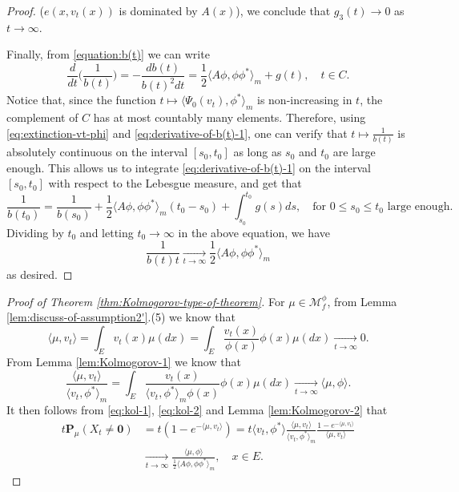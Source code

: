 \documentclass[UTF8]{pkuthss}
\theoremstyle{plain}
\theoremstyle{definition}
\numberwithin{equation}{section}
\begin{document}
\begin{proof}
	($e(x,v_t(x))$ is dominated by $ A(x)$), we conclude that $g_3(t)\to 0$ as $t\to\infty$.
\par
	Finally, from \eqref{equation:b(t)} we can write
\begin{equation}\label{eq:derivative-of-b(t)-1}
	\frac{d}{dt} \Big(\frac{1}{b(t)}\Big)
	= -\frac{d b(t)}{b(t)^2dt}
	= \frac{1}{2}\langle  A\phi,\phi\phi^*\rangle_m + g(t),
	\quad t\in C.
\end{equation}
	Notice that, since the function $t\mapsto \langle\Psi_0(v_t),\phi^*\rangle_m$ is non-increasing in $t$, 
		the complement of $C$ has at most countably many elements.
	Therefore, using \eqref{eq:extinction-vt-phi} and \eqref{eq:derivative-of-b(t)-1}, one can verify that $t\mapsto \frac{1}{b(t)}$ is absolutely continuous on the interval $[s_0,t_0]$ as long as $s_0$ and $t_0$ are large enough.
	This allows us to integrate \eqref{eq:derivative-of-b(t)-1} on the interval $[s_0,t_0]$ with respect to the Lebesgue measure, and get that
\[
	\frac{1}{b(t_0)}
	= \frac{1}{b(s_0)} + \frac{1}{2}\langle A\phi,\phi\phi^*\rangle_m(t_0-s_0) + \int_{s_0}^{t_0} g(s)ds,
	\quad \text{for } 0\leq s_0\leq t_0 \text{ large enough}.
\]
	Dividing by $t_0$ and letting $t_0\to\infty$ in the above equation, we have
\[
	\frac{1}{b(t)t}
	\xrightarrow[t\to\infty]{} \frac{1}{2}\langle  A\phi,\phi\phi^*\rangle_m
\]
	as desired.
\end{proof}
\begin{proof}[Proof of Theorem \ref{thm:Kolmogorov-type-of-theorem}]
	For $\mu \in \mathcal M^\phi_f$, from Lemma \ref{lem:discuss-of-assumption2'}.(5) we know that
\begin{equation}\label{eq:kol-1}
	\langle \mu ,v_t\rangle
    = \int_E v_t(x) \mu(dx)
	= \int_E \frac{v_t(x)}{\phi(x)} \phi(x)\mu(dx)
	\xrightarrow[t\to\infty]{} 0.
\end{equation}
	From Lemma \ref{lem:Kolmogorov-1} we know that
\begin{equation}\label{eq:kol-2}
     \frac {\langle\mu, v_t\rangle}{ \langle v_t,\phi^*\rangle_m}
	= \int_E \frac{v_t(x)}{\langle v_t, \phi^* \rangle_m \phi(x)}\phi(x)\mu(dx)
	\xrightarrow[t\to\infty]{} \langle \mu,\phi\rangle.
\end{equation}
	It then follows from \eqref{eq:kol-1}, \eqref{eq:kol-2} and Lemma \ref{lem:Kolmogorov-2} that
\begin{align}
	t\mathbf P_{\mu}(X_t\neq \mathbf 0)
	&= t (1-e^{-\langle \mu, v_t \rangle})
	= t \langle v_t,\phi^*\rangle\frac{\langle \mu,v_t\rangle }{\langle v_t,\phi^*\rangle_m} \frac {1-e^{-\langle \mu, v_t \rangle}} {\langle \mu, v_t \rangle}\\
	&\xrightarrow[t\to\infty]{} \frac{\langle \mu,\phi\rangle} {\frac{1}{2}\langle  A \phi,\phi \phi^*\rangle_m},
	\quad x\in E.
\end{align}
\end{proof}
\end{document}
